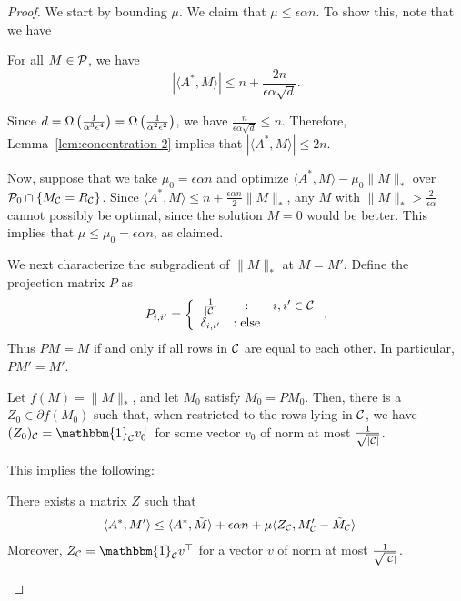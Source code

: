 \documentclass[11pt]{article}
\newcommand{\M}{\tilde{M}}
\newcommand{\Aa}{A^*}
\newcommand{\bi}{\mathbbm{1}}
\begin{document}
\begin{proof}
We start by bounding $\mu$. We claim that $\mu \leq \epsilon \alpha n$. 
To show this, note that we have
\begin{lemma}
\label{lem:concentration-2}
For all $M \in \mathcal{P}$, we have
\[ |\langle \Aa, M\rangle| \leq n + \frac{2n}{\epsilon\alpha\sqrt{d}}. \]
\end{lemma}
Since $d = \Omega\left(\frac{1}{\alpha^3\epsilon^4}\right) = \Omega\left(\frac{1}{\alpha^2\epsilon^2}\right)$, 
we have $\frac{n}{\epsilon\alpha\sqrt{d}} \leq n$. Therefore, Lemma~\ref{lem:concentration-2} 
implies that $|\langle \Aa, M \rangle| \leq 2n$.

Now, suppose that we take $\mu_0 = \epsilon \alpha n$ and optimize $\langle \Aa, M \rangle - \mu_0\|M\|_*$ over 
$\mathcal{P}_0 \cap \{M_{\mathcal{C}} = R_{\mathcal{C}}\}$. Since $\langle \Aa, M \rangle \leq n + \frac{\epsilon \alpha n}{2}\|M\|_*$, 
any $M$ with $\|M\|_* > \frac{2}{\epsilon\alpha}$ cannot possibly be optimal, since the solution $M = 0$ would 
be better. This implies that $\mu \leq \mu_0 = \epsilon \alpha n$, as claimed.

We next characterize the subgradient of $\|M\|_*$ at $M = M'$.
Define the projection matrix $P$ as
\[ P_{i,i'} = \left\{ \begin{array}{ccl} \frac{1}{|\mathcal{C}|} & : & i, i' \in \mathcal{C} \\ \delta_{i,i'} & : \text{else} \end{array} \right.. \]
Thus $PM = M$ if and only if all rows in $\mathcal{C}$ are equal to each other.
In particular, $PM' = M'$.
\begin{lemma}
\label{lem:subgradient}
Let $f(M) = \|M\|_*$, and let 
$M_0$ satisfy $M_0 = PM_0$. Then,
there is a $Z_0 \in \partial f(M_0)$ such that, when restricted 
to the rows lying in $\mathcal{C}$, we have $(Z_0)_{\sC} = \bi_{\sC} v_0^{\top}$
for some vector $v_0$ of norm at most $\frac{1}{\sqrt{|\mathcal{C}|}}$.
\end{lemma}
This implies the following:
\begin{proposition}
There exists a matrix $Z$ such that
\begin{align}
\langle \Aa, M' \rangle &\leq \langle \Aa, \M \rangle + \epsilon\alpha n + \mu \langle Z_{\sC}, M'_{\sC}-\M_{\sC} \rangle
\end{align}
Moreover, $Z_{\sC} = \bi_{\sC}v^{\top}$ for a vector $v$ of norm at most $\frac{1}{\sqrt{|\mathcal{C}|}}$.
\end{proposition}
\end{proof}
\end{document}
